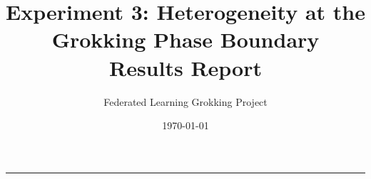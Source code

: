 \documentclass[11pt,a4paper]{article}
\title{Experiment 3: Heterogeneity at the Grokking Phase Boundary\\[0.3em]
\large Results Report}
\author{Federated Learning Grokking Project}
\date{\today}
\begin{document}
\maketitle
\tableofcontents
\vspace{1em}
\noindent\rule{\textwidth}{0.4pt}


\end{document}
